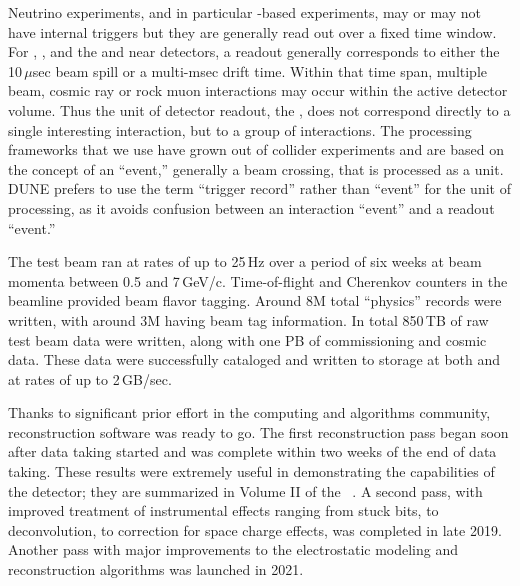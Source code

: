 \documentclass[../main-v1.tex]{subfiles}
\begin{document}

Neutrino experiments, and in particular -based experiments, may or may not have internal triggers but they are generally read out over a fixed time window.  For , ,  and the  and  near detectors, a readout generally corresponds to either the 10\,$\mu$sec beam spill or a multi-msec  drift time.  Within that time span, multiple beam, cosmic ray or rock muon interactions may occur within the active detector volume.  Thus the unit of detector readout, the , does not correspond directly to a single interesting interaction, but to a group of interactions. The processing frameworks that we use have grown out of collider experiments and are based on the concept of an ``event,'' generally a beam crossing, that is processed as a unit.  DUNE prefers to use the term ``trigger record'' rather than ``event'' for the unit of processing, as it avoids confusion between an interaction ``event'' and a readout ``event.''  


The test beam ran at rates of up to 25\,Hz over a period of six weeks at beam momenta between 0.5 and 7\,GeV/c.  Time-of-flight and Cherenkov counters in the beamline provided beam flavor tagging.  Around 8M total ``physics'' records were written, with around 3M having beam tag information.  In total  850\,TB of raw test beam data were written, along with one PB of commissioning and cosmic data. These data were successfully cataloged and written to storage at both  and  at rates of up to 2\,GB/sec.   

Thanks to significant prior effort in the  %
computing and algorithms community, reconstruction software was ready to go. The first reconstruction pass began soon after data taking started and was complete within two weeks of the end of data taking.  These results were extremely useful in demonstrating the capabilities of the detector; they are summarized in Volume II of the  ~\cite{Abi:2020evt}.  A second pass, with improved treatment of instrumental effects ranging from stuck bits, to \twod deconvolution, to correction for space charge effects, was completed in late 2019. Another pass with major improvements to the electrostatic modeling and reconstruction algorithms was launched in 2021. 
\end{document}
